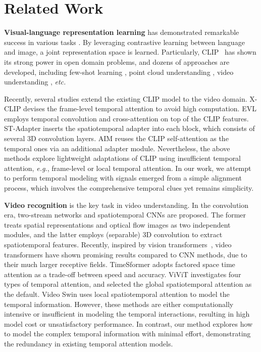 \documentclass[10pt,twocolumn,letterpaper]{article}
\begin{document}
\section{Related Work}

\noindent \textbf{Visual-language representation learning} has demonstrated remarkable success in various tasks \cite{b21,jia2021scaling,b19}. By leveraging contrastive learning between language and image, a joint representation space is learned.
Particularly, CLIP~\cite{b21} has shown its strong power in open domain problems, and dozens of approaches are developed, including few-shot learning \cite{b29,b30}, point cloud understanding \cite{b31,b32}, video understanding \cite{b33,b22,b23}, \emph{etc.}

Recently, several studies extend the existing CLIP model to the video domain.
X-CLIP \cite{b24} devises the frame-level temporal attention to avoid high computation.
EVL \cite{b25} employs temporal convolution and cross-attention on top of the CLIP features.
ST-Adapter \cite{pan2022st} inserts the spatiotemporal adapter into each block, which consists of several 3D convolution layers.
AIM \cite{yang2023aim} reuses the CLIP self-attention as the temporal ones via an additional adapter module.
Nevertheless, the above methods explore lightweight adaptations of CLIP using insufficient temporal attention, \emph{e.g.}, frame-level or local temporal attention.
In our work, we attempt to perform temporal modeling with signals emerged from a simple alignment process, which involves the comprehensive temporal clues yet remains simplicity.


\vspace{0.05in}
\noindent \textbf{Video recognition} is the key task in video understanding. In the convolution era, two-stream networks \cite{b1,b2,b3} and spatiotemporal CNNs \cite{b4,b7,b8,b9} are proposed. The former treats spatial representations and optical flow images as two independent modules, and the latter employs (separable) 3D convolution to extract spatiotemporal features.
Recently, inspired by vision transformers~\cite{dosovitskiy2020image,touvron2021training,zhanghivit,tian2023resformer,han2021connection}, video transformers \cite{b13,b15,b16,b17,b37,akbari2021vatt} have shown promising results compared to CNN methods, due to their much larger receptive fields.
TimeSformer \cite{b13} adopts factored space time attention as a trade-off between speed and accuracy.
ViViT \cite{b17} investigates four types of temporal attention, and selected the global spatiotemporal attention as the default.
Video Swin \cite{b15} uses local spatiotemporal attention to model the temporal information.
However, these methods are either computationally intensive or insufficient in modeling the temporal interactions, resulting in high model cost or unsatisfactory performance.
In contrast, our method explores how to model the complex temporal information with minimal effort, demonstrating the redundancy in existing temporal attention models.
\end{document}
